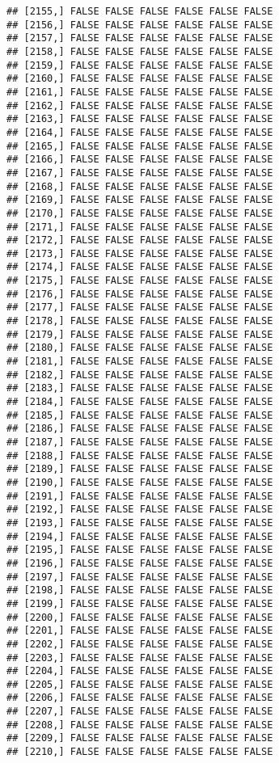 \documentclass[
]{article}
\begin{document}
\begin{verbatim}
## [2155,] FALSE FALSE FALSE FALSE FALSE FALSE
## [2156,] FALSE FALSE FALSE FALSE FALSE FALSE
## [2157,] FALSE FALSE FALSE FALSE FALSE FALSE
## [2158,] FALSE FALSE FALSE FALSE FALSE FALSE
## [2159,] FALSE FALSE FALSE FALSE FALSE FALSE
## [2160,] FALSE FALSE FALSE FALSE FALSE FALSE
## [2161,] FALSE FALSE FALSE FALSE FALSE FALSE
## [2162,] FALSE FALSE FALSE FALSE FALSE FALSE
## [2163,] FALSE FALSE FALSE FALSE FALSE FALSE
## [2164,] FALSE FALSE FALSE FALSE FALSE FALSE
## [2165,] FALSE FALSE FALSE FALSE FALSE FALSE
## [2166,] FALSE FALSE FALSE FALSE FALSE FALSE
## [2167,] FALSE FALSE FALSE FALSE FALSE FALSE
## [2168,] FALSE FALSE FALSE FALSE FALSE FALSE
## [2169,] FALSE FALSE FALSE FALSE FALSE FALSE
## [2170,] FALSE FALSE FALSE FALSE FALSE FALSE
## [2171,] FALSE FALSE FALSE FALSE FALSE FALSE
## [2172,] FALSE FALSE FALSE FALSE FALSE FALSE
## [2173,] FALSE FALSE FALSE FALSE FALSE FALSE
## [2174,] FALSE FALSE FALSE FALSE FALSE FALSE
## [2175,] FALSE FALSE FALSE FALSE FALSE FALSE
## [2176,] FALSE FALSE FALSE FALSE FALSE FALSE
## [2177,] FALSE FALSE FALSE FALSE FALSE FALSE
## [2178,] FALSE FALSE FALSE FALSE FALSE FALSE
## [2179,] FALSE FALSE FALSE FALSE FALSE FALSE
## [2180,] FALSE FALSE FALSE FALSE FALSE FALSE
## [2181,] FALSE FALSE FALSE FALSE FALSE FALSE
## [2182,] FALSE FALSE FALSE FALSE FALSE FALSE
## [2183,] FALSE FALSE FALSE FALSE FALSE FALSE
## [2184,] FALSE FALSE FALSE FALSE FALSE FALSE
## [2185,] FALSE FALSE FALSE FALSE FALSE FALSE
## [2186,] FALSE FALSE FALSE FALSE FALSE FALSE
## [2187,] FALSE FALSE FALSE FALSE FALSE FALSE
## [2188,] FALSE FALSE FALSE FALSE FALSE FALSE
## [2189,] FALSE FALSE FALSE FALSE FALSE FALSE
## [2190,] FALSE FALSE FALSE FALSE FALSE FALSE
## [2191,] FALSE FALSE FALSE FALSE FALSE FALSE
## [2192,] FALSE FALSE FALSE FALSE FALSE FALSE
## [2193,] FALSE FALSE FALSE FALSE FALSE FALSE
## [2194,] FALSE FALSE FALSE FALSE FALSE FALSE
## [2195,] FALSE FALSE FALSE FALSE FALSE FALSE
## [2196,] FALSE FALSE FALSE FALSE FALSE FALSE
## [2197,] FALSE FALSE FALSE FALSE FALSE FALSE
## [2198,] FALSE FALSE FALSE FALSE FALSE FALSE
## [2199,] FALSE FALSE FALSE FALSE FALSE FALSE
## [2200,] FALSE FALSE FALSE FALSE FALSE FALSE
## [2201,] FALSE FALSE FALSE FALSE FALSE FALSE
## [2202,] FALSE FALSE FALSE FALSE FALSE FALSE
## [2203,] FALSE FALSE FALSE FALSE FALSE FALSE
## [2204,] FALSE FALSE FALSE FALSE FALSE FALSE
## [2205,] FALSE FALSE FALSE FALSE FALSE FALSE
## [2206,] FALSE FALSE FALSE FALSE FALSE FALSE
## [2207,] FALSE FALSE FALSE FALSE FALSE FALSE
## [2208,] FALSE FALSE FALSE FALSE FALSE FALSE
## [2209,] FALSE FALSE FALSE FALSE FALSE FALSE
## [2210,] FALSE FALSE FALSE FALSE FALSE FALSE

\end{verbatim}
\end{document}

